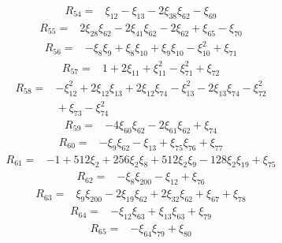 \[
\begin{aligned}
 R_{54}={}&\xi_{12}-\xi_{13}-2\xi_{38}\xi_{62}-\xi_{69}
\end{aligned}
\]
\[
\begin{aligned}
 R_{55}={}&2\xi_{28}\xi_{62}-2\xi_{41}\xi_{62}-2\xi_{62}+\xi_{65}-\xi_{70}
\end{aligned}
\]
\[
\begin{aligned}
 R_{56}={}&-\xi_{8}\xi_{9}+\xi_{8}\xi_{10}+\xi_{9}\xi_{10}-\xi_{10}^{2}+\xi_{71}
\end{aligned}
\]
\[
\begin{aligned}
 R_{57}={}&1+2\xi_{11}+\xi_{11}^{2}-\xi_{71}^{2}+\xi_{72}
\end{aligned}
\]
\[
\begin{aligned}
 R_{58}={}&-\xi_{12}^{2}+2\xi_{12}\xi_{13}+2\xi_{12}\xi_{74}-\xi_{13}^{2}-2\xi_{13}\xi_{74}-\xi_{72}^{2}\\
 &{}+\xi_{73}-\xi_{74}^{2}
\end{aligned}
\]
\[
\begin{aligned}
 R_{59}={}&-4\xi_{60}\xi_{62}-2\xi_{61}\xi_{62}+\xi_{74}
\end{aligned}
\]
\[
\begin{aligned}
 R_{60}={}&-\xi_{9}\xi_{62}-\xi_{13}+\xi_{75}\xi_{76}+\xi_{77}
\end{aligned}
\]
\[
\begin{aligned}
 R_{61}={}&-1+512\xi_{2}+256\xi_{2}\xi_{8}+512\xi_{2}\xi_{9}-128\xi_{2}\xi_{19}+\xi_{75}
\end{aligned}
\]
\[
\begin{aligned}
 R_{62}={}&-\xi_{8}\xi_{200}-\xi_{12}+\xi_{76}
\end{aligned}
\]
\[
\begin{aligned}
 R_{63}={}&\xi_{9}\xi_{200}-2\xi_{19}\xi_{62}+2\xi_{32}\xi_{62}+\xi_{67}+\xi_{78}
\end{aligned}
\]
\[
\begin{aligned}
 R_{64}={}&-\xi_{12}\xi_{63}+\xi_{13}\xi_{63}+\xi_{79}
\end{aligned}
\]
\[
\begin{aligned}
 R_{65}={}&-\xi_{64}\xi_{79}+\xi_{80}
\end{aligned}
\]
